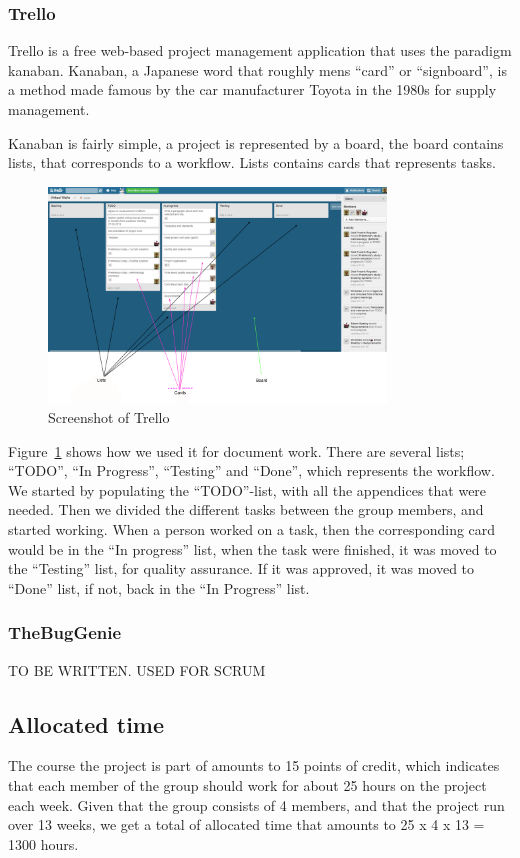 \documentclass[11pt]{book}
\begin{document}
\subsubsection{Trello}
Trello is a free web-based project management application that uses the paradigm kanaban. Kanaban, a Japanese word that roughly mens ``card'' or ``signboard'', is a method made famous by the car manufacturer Toyota in the 1980s for supply management. 

Kanaban is fairly simple, a project is represented by a board, the board contains lists, that corresponds to a workflow. Lists contains cards that represents tasks.

\begin{figure}[H]
      \centering
      \includegraphics[width=0.8\textwidth]{Figures/trello.png}
      \caption{Screenshot of Trello}
      \label{fig:tools_trello}
\end{figure}

Figure~\ref{fig:tools_trello} shows how we used it for document work. There are several lists; ``TODO'', ``In Progress'', ``Testing'' and ``Done'', which represents the workflow. We started by populating the ``TODO''-list, with all the appendices that were needed. Then we divided the different tasks between the group members, and started working. When a person worked on a task, then the corresponding card would be in the ``In progress'' list, when the task were finished, it was moved to the ``Testing'' list, for quality assurance. If it was approved, it was moved to ``Done'' list, if not, back in the ``In Progress'' list.

\subsubsection{TheBugGenie}
TO BE WRITTEN. USED FOR SCRUM

\subsection{Allocated time}
The course the project is part of amounts to 15 points of credit, which indicates that each member of the group should work for about 25 hours on the project each week. Given that the group consists of 4 members, and that the project run over 13 weeks, we get a total of allocated time that amounts to 25 x 4 x 13 = 1300 hours.
\end{document}
